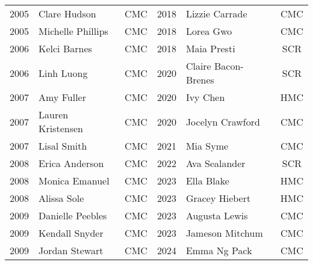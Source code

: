 \begin{table}[H]
{\begin{tabular}{c l c | c l c}
    2005 & Clare Hudson & CMC & 2018 & Lizzie Carrade & CMC \\
    2005 & Michelle Phillips & CMC & 2018 & Lorea Gwo & CMC \\
    2006 & Kelci Barnes & CMC & 2018 & Maia Presti & SCR \\
    2006 & Linh Luong & CMC & 2020 & Claire Bacon-Brenes & SCR \\
    2007 & Amy Fuller & CMC & 2020 & Ivy Chen & HMC \\
    2007 & Lauren Kristensen & CMC & 2020 & Jocelyn Crawford & CMC \\
    2007 & Lisal Smith & CMC & 2021 & Mia Syme & CMC \\
    2008 & Erica Anderson & CMC & 2022 & Ava Sealander & SCR \\
    2008 & Monica Emanuel & CMC & 2023 & Ella Blake & HMC \\
    2008 & Alissa Sole & CMC & 2023 & Gracey Hiebert & HMC \\
    2009 & Danielle Peebles & CMC & 2023 & Augusta Lewis & CMC \\
    2009 & Kendall Snyder & CMC & 2023 & Jameson Mitchum & CMC \\
    2009 & Jordan Stewart & CMC & 2024 & Emma Ng Pack & CMC \\
    \bottomrule
    \end{tabular}}
\end{table}



